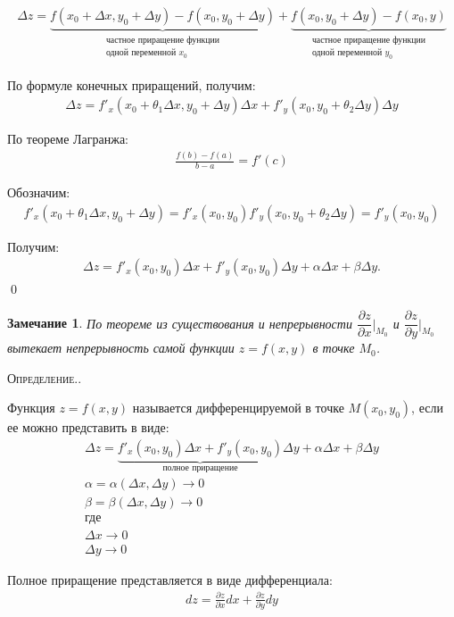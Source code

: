 \documentclass[a4paper,12pt,oneside]{extbook}
\newcommand{\newpar}{$ $\par\nobreak\ignorespaces}
\newenvironment{definition}[1][]{\noindent\textsc{Определение.\if\relax\detokenize{#1}\relax\else\;#1.\fi}\newpar}{}
\theoremstyle{numbered}
\theoremstyle{unnumbered}
\theoremstyle{named}
\theoremstyle{unnumbered}
\theoremstyle{named}
\theoremstyle{named}
\theoremstyle{named}
\newtheorem*{note}{Замечание}
\renewenvironment{proof}{{\noindent\textsc{Доказательство.}}}{\qed}
\begin{document}
\begin{proof}
    \begin{gather*}
        \Delta z =
        \underbrace{f(x_0 + \Delta x, y_0 + \Delta y) - f(x_0, y_0 + \Delta y)}_{\substack{\text{частное приращение функции} \\ \text{одной переменной \(x_0\)}}}
        +
        \underbrace{f(x_0, y_0 + \Delta y) - f(x_0, y)}_{\substack{\text{частное приращение функции} \\ \text{одной переменной \(y_0\)}}}
    \end{gather*}

    По формуле конечных приращений, получим:
    \begin{gather*}
        \Delta z = f'_x(x_0 + \theta_1 \Delta x, y_0 + \Delta y) \Delta x + f'_y(x_0, y_0 + \theta_2 \Delta y) \Delta y
    \end{gather*}

    По теореме Лагранжа:
    \begin{gather*}
        \frac{f(b) - f(a)}{b - a} = f'(c)
    \end{gather*}

    Обозначим:
    \begin{gather*}
        f'_x(x_0 + \theta_1 \Delta x, y_0 + \Delta y) = f'_x(x_0, y_0)
        f'_y(x_0, y_0 + \theta_2 \Delta y) = f'_y(x_0, y_0)
    \end{gather*}

    Получим:
    \begin{gather*}
        \Delta z = f'_x(x_0, y_0) \Delta x + f'_y(x_0, y_0) \Delta y + \alpha \Delta x + \beta \Delta y.
    \end{gather*}
\end{proof}

\begin{note}
    По теореме из существования и непрерывности \(\dfrac{\partial z}{\partial x} \Big|_{M_0}\) и \(\dfrac{\partial z}{\partial y} \Big|_{M_0}\) вытекает непрерывность самой функции \(z = f(x, y)\) в точке \(M_0\).
\end{note}

\begin{definition}
    Функция \(z = f(x, y)\) называется дифференцируемой в точке \(M(x_0, y_0)\), если ее можно представить в виде:
    \begin{gather*}
        \Delta z = \underbrace{f'_x(x_0, y_0) \Delta x + f'_y(x_0, y_0)}_\text{полное приращение} \Delta y + \alpha \Delta x + \beta \Delta y \\
        \alpha = \alpha(\Delta x, \Delta y) \to 0 \\
        \beta = \beta(\Delta x, \Delta y) \to 0 \\
        \text{где} \\
        \Delta x \to 0 \\
        \Delta y \to 0
    \end{gather*}

    Полное приращение представляется в виде дифференциала:
    \begin{gather*}
        dz = \frac{\partial z}{\partial x} dx + \frac{\partial z}{\partial y} dy
    \end{gather*}
\end{definition}
\end{document}
